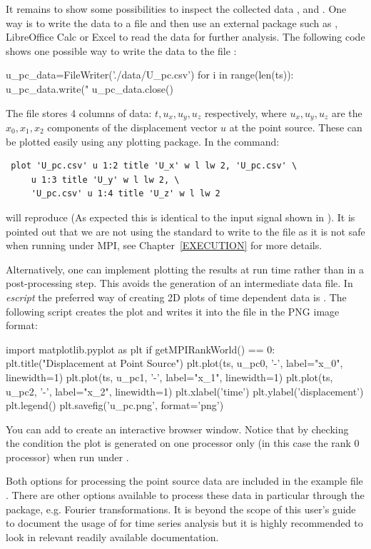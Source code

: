 It remains to show some possibilities to inspect the collected data
,  and .
One way is to write the data to a file and then use an external package such
as \gnuplot, LibreOffice Calc or Excel to read the data for further analysis.
The following code shows one possible way to write the data to the file :
\begin{python}
  u_pc_data=FileWriter('./data/U_pc.csv')
  for i in range(len(ts)):
      u_pc_data.write("%
  u_pc_data.close()
\end{python}
The file  stores 4 columns of data: $t,u_x,u_y,u_z$
respectively, where $u_x,u_y,u_z$ are the
$x_0,x_1,x_2$ components of the displacement
vector $u$ at the point source.
These can be plotted easily using any plotting package.
In \gnuplot the command:
\begin{verbatim}
 plot 'U_pc.csv' u 1:2 title 'U_x' w l lw 2, 'U_pc.csv' \
     u 1:3 title 'U_y' w l lw 2, \
     'U_pc.csv' u 1:4 title 'U_z' w l lw 2
\end{verbatim}
will reproduce  (As expected this is identical to the input
signal shown in ).
It is pointed out that we are not using the standard \PYTHON \function{open}
to write to the file \code{U_pc.csv} as it is not safe when running \escript
under MPI, see Chapter~\ref{EXECUTION} for more details.

Alternatively, one can implement plotting the results at run time rather than
in a post-processing step.
This avoids the generation of an intermediate data file.
In {\it escript} the preferred way of creating 2D plots of time dependent data
is \MATPLOTLIB. The following script creates the plot and writes it into the
file \file{u_pc.png} in the PNG image format:
\begin{python}
  import matplotlib.pyplot as plt
  if getMPIRankWorld() == 0:
      plt.title("Displacement at Point Source")
      plt.plot(ts, u_pc0, '-', label="x_0", linewidth=1)
      plt.plot(ts, u_pc1, '-', label="x_1", linewidth=1)
      plt.plot(ts, u_pc2, '-', label="x_2", linewidth=1)
      plt.xlabel('time')
      plt.ylabel('displacement')
      plt.legend()
      plt.savefig('u_pc.png', format='png')
\end{python}
You can add  to create an interactive browser window.
Notice that by checking the condition  the plot
is generated on one processor only (in this case the rank 0 processor) when
run under \MPI. 

Both options for processing the point source data are included in the example
file . There are other options available to process these data
in particular through the \SCIPY package, e.g. Fourier transformations.
It is beyond the scope of this user's guide to document the usage of
\SCIPY for time series analysis but it is highly recommended to look in
relevant readily available documentation.

